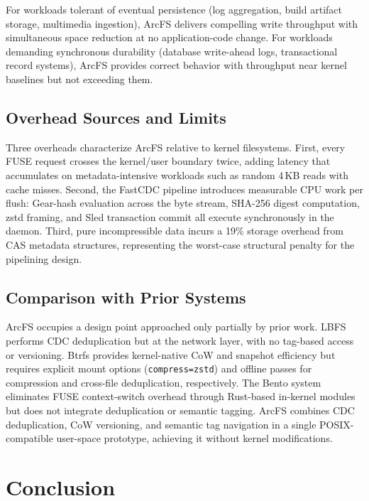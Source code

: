 \documentclass[conference]{IEEEtran}
\begin{document}
For workloads tolerant of eventual persistence (log aggregation, build
artifact storage, multimedia ingestion), ArcFS delivers compelling write
throughput with simultaneous space reduction at no application-code change.
For workloads demanding synchronous durability (database write-ahead logs,
transactional record systems), ArcFS provides correct behavior with
throughput near kernel baselines but not exceeding them.

\subsection{Overhead Sources and Limits}

Three overheads characterize ArcFS relative to kernel filesystems. First,
every FUSE request crosses the kernel/user boundary twice, adding latency
that accumulates on metadata-intensive workloads such as random 4\,KB
reads with cache misses. Second, the FastCDC pipeline introduces
measurable CPU work per flush: Gear-hash evaluation across the byte stream,
SHA-256 digest computation, zstd framing, and Sled transaction commit all
execute synchronously in the daemon. Third, pure incompressible data
incurs a 19\% storage overhead from CAS metadata structures, representing
the worst-case structural penalty for the pipelining design.

\subsection{Comparison with Prior Systems}

ArcFS occupies a design point approached only partially by prior work.
LBFS~\cite{muthitacharoen2001lbfs} performs CDC deduplication but at the
network layer, with no tag-based access or versioning. Btrfs provides
kernel-native CoW and snapshot efficiency but requires explicit mount
options (\texttt{compress=zstd}) and offline passes for compression and
cross-file deduplication, respectively. The Bento
system~\cite{miller2021bento} eliminates FUSE context-switch overhead
through Rust-based in-kernel modules but does not integrate deduplication
or semantic tagging. ArcFS combines CDC deduplication, CoW versioning,
and semantic tag navigation in a single POSIX-compatible user-space
prototype, achieving it without kernel modifications.

\section{Conclusion}
\end{document}
